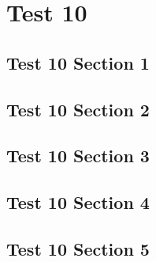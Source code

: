 \chapter{Test 10}
\localtableofcontents
\clearpage

\section{Test 10 Section 1}

\linebreak

\section{Test 10 Section 2}

\linebreak

\section{Test 10 Section 3}

\linebreak

\section{Test 10 Section 4}

\linebreak

\section{Test 10 Section 5}

\linebreak